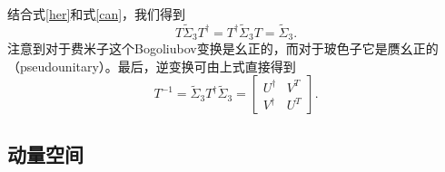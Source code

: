 结合式\eqref{her}和式\eqref{can}，我们得到
\begin{equation}
  T \tilde \Sigma_3 T^\dagger = T^\dagger \tilde \Sigma_3 T =\tilde \Sigma_3.
\end{equation}
注意到对于费米子这个Bogoliubov变换是幺正的，而对于玻色子它是赝幺正的（pseudounitary）。最后，逆变换可由上式直接得到
\begin{equation}
  \boxed{T^{-1}=\tilde \Sigma_3 T^\dagger \tilde \Sigma_3 = \begin{bmatrix}
      U^\dagger & V^T\\
      V^\dagger & U^T
  \end{bmatrix}.}
\end{equation}

\subsection{动量空间}

